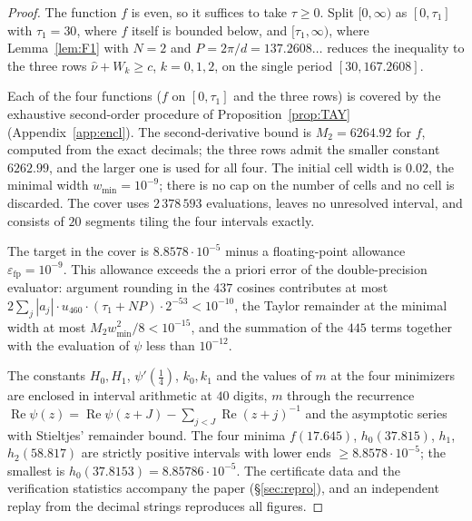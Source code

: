 \documentclass[11pt]{amsart}
\theoremstyle{definition}
\theoremstyle{remark}
\newcommand{\Rel}{\operatorname{Re}}
\newcommand{\nuh}{\widehat\nu}
\begin{document}
\begin{proof}
The function $f$ is even, so it suffices to take $\tau\ge0$. Split $[0,\infty)$ as $[0,\tau_1]$
with $\tau_1=30$, where $f$ itself is bounded below, and $[\tau_1,\infty)$, where
Lemma~\ref{lem:F1} with $N=2$ and $P=2\pi/d=137.2608\ldots$ reduces the inequality to the three
rows $\nuh+W_k\ge c$, $k=0,1,2$, on the single period $[30,167.2608]$.

Each of the four functions ($f$ on $[0,\tau_1]$ and the three rows) is covered by the exhaustive
second-order procedure of Proposition~\ref{prop:TAY} (Appendix~\ref{app:encl}). The second-derivative
bound is $M_2=6264.92$ for $f$, computed from the exact decimals; the three rows admit the smaller
constant $6262.99$, and the larger one is used for all four. The initial cell width is $0.02$, the
minimal width $w_{\min}=10^{-9}$; there is no cap on the number of cells and no cell is discarded.
The cover uses $2\,378\,593$ evaluations, leaves no unresolved interval, and consists of $20$
segments tiling the four intervals exactly.

The target in the cover is $8.8578\cdot10^{-5}$ minus a floating-point allowance
$\varepsilon_{\mathrm{fp}}=10^{-9}$. This allowance exceeds the a priori error of the double-precision
evaluator: argument rounding in the $437$ cosines contributes at most
$2\sum_j|a_j|\cdot u_{460}\cdot(\tau_1+NP)\cdot2^{-53}<10^{-10}$, the Taylor remainder at the minimal
width at most $M_2w_{\min}^2/8<10^{-15}$, and the summation of the $445$ terms together with the
evaluation of $\psi$ less than $10^{-12}$.

The constants $H_0,H_1$, $\psi'(\frac14)$, $k_0,k_1$ and the values of $m$ at the four minimizers
are enclosed in interval arithmetic at $40$ digits, $m$ through the recurrence
$\Rel\psi(z)=\Rel\psi(z+J)-\sum_{j<J}\Rel(z+j)^{-1}$ and the asymptotic series with Stieltjes'
remainder bound. The four minima $f(17.645)$, $h_0(37.815)$, $h_1$, $h_2(58.817)$ are strictly
positive intervals with lower ends $\ge8.8578\cdot10^{-5}$; the smallest is
$h_0(37.8153)=8.85786\cdot10^{-5}$. The certificate data and the verification statistics accompany
the paper (\S\ref{sec:repro}), and an independent replay from the decimal strings reproduces all
figures.
\end{proof}
\end{document}
